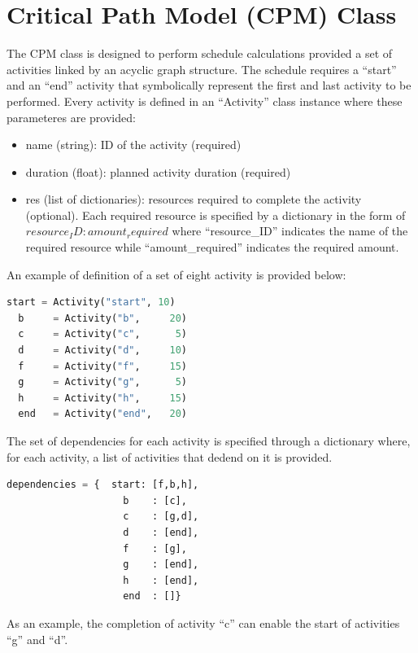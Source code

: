 \section{Critical Path Model (CPM) Class}
\label{sec:CPM}

The CPM class is designed to perform schedule calculations provided a set of activities
linked by an acyclic graph structure.
The schedule requires a ``start'' and an ``end'' activity that symbolically represent the first and last
activity to be performed. 
Every activity is defined in an ``Activity'' class instance where these parameteres are provided:
\begin{itemize}
  \item name (string): ID of the activity (required)
  \item duration (float): planned activity duration (required)
  \item res (list of dictionaries): resources required to complete the activity (optional). Each required 
                                    resource is specified by a dictionary in the form of 
                                    ${resource_ID: amount_required}$ where ``resource_ID'' indicates the name 
                                    of the required resource while ``amount_required'' indicates the required 
                                    amount.
\end{itemize}

An example of definition of a set of eight activity is provided below:
\begin{lstlisting}[language=Python]
  start = Activity("start", 10)
  b     = Activity("b",     20)
  c     = Activity("c",      5)
  d     = Activity("d",     10)
  f     = Activity("f",     15)
  g     = Activity("g",      5)
  h     = Activity("h",     15)
  end   = Activity("end",   20)
\end{lstlisting}

The set of dependencies for each activity is specified through a dictionary where, for each activity,
a list of activities that dedend on it is provided. 
\begin{lstlisting}[language=Python]
  dependencies = {  start: [f,b,h],
                    b    : [c],
                    c    : [g,d],
                    d    : [end],
                    f    : [g],
                    g    : [end],
                    h    : [end],
                    end  : []}
\end{lstlisting}
As an example, the completion of activity ``c'' can enable the start of activities ``g'' and ``d''.

